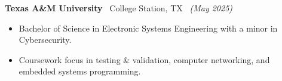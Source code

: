 \documentclass[class=article, crop=false]{standalone}
\begin{document}
\textbf{Texas A\&M University} \textbar\ College Station, TX \hfill\
\textsl{(May 2025)}

\begin{itemize}[leftmargin=*]

	\item Bachelor of Science in Electronic Systems Engineering with a minor in 
	Cybersecurity.

	\item Coursework focus in testing \& validation, computer networking, and 
	embedded systems programming.
\end{itemize}
\end{document}
